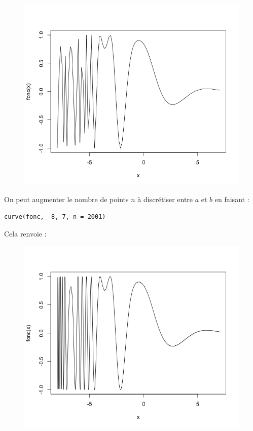 \begin{figure}[H]\begin{center}\includegraphics[scale=0.4]{ilu/gra27.png}\end{center}\end{figure}
On peut augmenter le nombre de points $n$ à discrétiser entre $a$ et $b$ en faisant :
\begin{lstlisting}[language=html]
curve(fonc, -8, 7, n = 2001)
\end{lstlisting}
Cela renvoie :
\begin{figure}[H]\begin{center}\includegraphics[scale=0.4]{ilu/gra28.png}\end{center}\end{figure}
